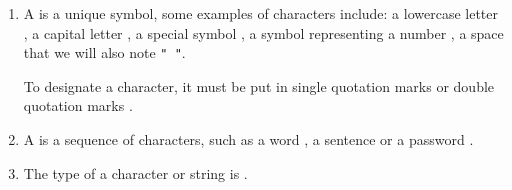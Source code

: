 \documentclass[11pt,class=report,crop=false]{standalone}
\begin{document}
\newcommand{\badletter}[1]{\underline{\textcolor{red}{#1}}}






\begin{cours}
\sauteligne
\begin{enumerate}
  \item A  is a unique symbol, some examples of characters include: a lowercase letter , a capital letter , a special symbol , a symbol representing a number , a space  that we will also note \lstinline[showstringspaces=true]!" "!.
  
To designate a character, it must be put in single quotation marks  or double quotation marks .
  
  \item A  is a sequence of characters, such as a word , a sentence  or a password \codeinline{"N[w5ms\}e\!"}.
  
  \item The type of a character or string is .

\end{enumerate}  
\end{cours}


\end{document}
